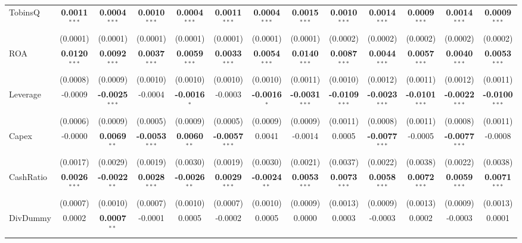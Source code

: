 \documentclass[11pt,a4paper]{article}
\begin{document}
\begin{table}[htbp]
\begin{tabular}{lcccccccccccc}
TobinsQ & \textbf{0.0011}$^{***}$ & \textbf{0.0004}$^{***}$ & \textbf{0.0010}$^{***}$ & \textbf{0.0004}$^{***}$ & \textbf{0.0011}$^{***}$ & \textbf{0.0004}$^{***}$ & \textbf{0.0015}$^{***}$ & \textbf{0.0010}$^{***}$ & \textbf{0.0014}$^{***}$ & \textbf{0.0009}$^{***}$ & \textbf{0.0014}$^{***}$ & \textbf{0.0009}$^{***}$ \\
 & (0.0001) & (0.0001) & (0.0001) & (0.0001) & (0.0001) & (0.0001) & (0.0001) & (0.0002) & (0.0002) & (0.0002) & (0.0002) & (0.0002) \\
ROA & \textbf{0.0120}$^{***}$ & \textbf{0.0092}$^{***}$ & \textbf{0.0037}$^{***}$ & \textbf{0.0059}$^{***}$ & \textbf{0.0033}$^{***}$ & \textbf{0.0054}$^{***}$ & \textbf{0.0140}$^{***}$ & \textbf{0.0087}$^{***}$ & \textbf{0.0044}$^{***}$ & \textbf{0.0057}$^{***}$ & \textbf{0.0040}$^{***}$ & \textbf{0.0053}$^{***}$ \\
 & (0.0008) & (0.0009) & (0.0010) & (0.0010) & (0.0010) & (0.0010) & (0.0011) & (0.0010) & (0.0012) & (0.0011) & (0.0012) & (0.0011) \\
Leverage & -0.0009 & \textbf{-0.0025}$^{***}$ & -0.0004 & \textbf{-0.0016}$^{*}$ & -0.0003 & \textbf{-0.0016}$^{*}$ & \textbf{-0.0031}$^{***}$ & \textbf{-0.0109}$^{***}$ & \textbf{-0.0023}$^{***}$ & \textbf{-0.0101}$^{***}$ & \textbf{-0.0022}$^{***}$ & \textbf{-0.0100}$^{***}$ \\
 & (0.0006) & (0.0009) & (0.0005) & (0.0009) & (0.0005) & (0.0009) & (0.0009) & (0.0011) & (0.0008) & (0.0011) & (0.0008) & (0.0011) \\
Capex & -0.0000 & \textbf{0.0069}$^{**}$ & \textbf{-0.0053}$^{***}$ & \textbf{0.0060}$^{**}$ & \textbf{-0.0057}$^{***}$ & 0.0041 & -0.0014 & 0.0005 & \textbf{-0.0077}$^{***}$ & -0.0005 & \textbf{-0.0077}$^{***}$ & -0.0008 \\
 & (0.0017) & (0.0029) & (0.0019) & (0.0030) & (0.0019) & (0.0030) & (0.0021) & (0.0037) & (0.0022) & (0.0038) & (0.0022) & (0.0038) \\
CashRatio & \textbf{0.0026}$^{***}$ & \textbf{-0.0022}$^{**}$ & \textbf{0.0028}$^{***}$ & \textbf{-0.0026}$^{**}$ & \textbf{0.0029}$^{***}$ & \textbf{-0.0024}$^{**}$ & \textbf{0.0053}$^{***}$ & \textbf{0.0073}$^{***}$ & \textbf{0.0058}$^{***}$ & \textbf{0.0072}$^{***}$ & \textbf{0.0059}$^{***}$ & \textbf{0.0071}$^{***}$ \\
 & (0.0007) & (0.0010) & (0.0007) & (0.0010) & (0.0007) & (0.0010) & (0.0009) & (0.0013) & (0.0009) & (0.0013) & (0.0009) & (0.0013) \\
DivDummy & 0.0002 & \textbf{0.0007}$^{**}$ & -0.0001 & 0.0005 & -0.0002 & 0.0005 & 0.0000 & 0.0003 & -0.0003 & 0.0002 & -0.0003 & 0.0001 \\

\end{tabular}
\end{table}
\end{document}
